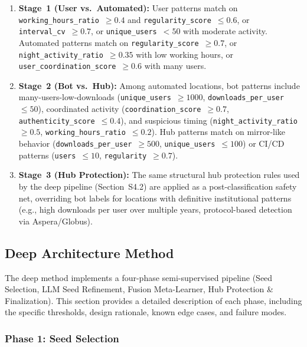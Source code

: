 \documentclass[11pt,a4paper]{article}
\begin{document}
\begin{sloppypar}
\begin{enumerate}
    \item \textbf{Stage~1 (User vs.\ Automated):} User patterns match on \texttt{working\_hours\_ratio}~$\geq 0.4$ and \texttt{regularity\_score}~$\leq 0.6$, or \texttt{interval\_cv}~$\geq 0.7$, or \texttt{unique\_users}~$< 50$ with moderate activity. Automated patterns match on \texttt{regularity\_score}~$\geq 0.7$, or \texttt{night\_activity\_ratio}~$\geq 0.35$ with low working hours, or \texttt{user\_coordination\_score}~$\geq 0.6$ with many users.

    \item \textbf{Stage~2 (Bot vs.\ Hub):} Among automated locations, bot patterns include many-users-low-downloads (\texttt{unique\_users}~$\geq 1000$, \texttt{downloads\_per\_user}~$\leq 50$), coordinated activity (\texttt{coordination\_score}~$\geq 0.7$, \texttt{authenticity\_score}~$\leq 0.4$), and suspicious timing (\texttt{night\_activity\_ratio}~$\geq 0.5$, \texttt{working\_hours\_ratio}~$\leq 0.2$). Hub patterns match on mirror-like behavior (\texttt{downloads\_per\_user}~$\geq 500$, \texttt{unique\_users}~$\leq 100$) or CI/CD patterns (\texttt{users}~$\leq 10$, \texttt{regularity}~$\geq 0.7$).

    \item \textbf{Stage~3 (Hub Protection):} The same structural hub protection rules used by the deep pipeline (Section~S4.2) are applied as a post-classification safety net, overriding bot labels for locations with definitive institutional patterns (e.g., high downloads per user over multiple years, protocol-based detection via Aspera/Globus).
\end{enumerate}
\end{sloppypar}

\subsection{Deep Architecture Method}

The deep method implements a four-phase semi-supervised pipeline (Seed Selection, LLM Seed Refinement, Fusion Meta-Learner, Hub Protection \& Finalization). This section provides a detailed description of each phase, including the specific thresholds, design rationale, known edge cases, and failure modes.

\subsubsection{Phase 1: Seed Selection}
\end{document}

